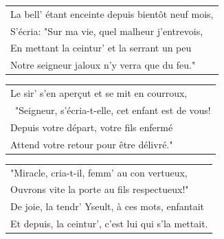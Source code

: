 \documentclass[a4paper, 14pt]{extarticle}
\begin{document}
\begin{flushleft}
\begin{tabularx}{0.8\textwidth} {
    >{\raggedright\arraybackslash}X}
La bell’ étant enceinte depuis bientôt neuf mois,\\
S’écria: "Sur ma vie, quel malheur j’entrevois,\\
En mettant la ceintur’ et la serrant un peu\\
Notre seigneur jaloux n’y verra que du feu."\\
\end{tabularx}
\end{flushleft}
\begin{flushleft}
\begin{tabularx}{0.8\textwidth} {
    >{\raggedright\arraybackslash}X}
Le sir’ s’en aperçut et se mit en courroux,\\\
"Seigneur, s’écria-t-elle, cet enfant est de vous!\\
Depuis votre départ, votre fils enfermé\\
Attend votre retour pour être délivré."\\
\end{tabularx}
\end{flushleft}
\begin{flushleft}
\begin{tabularx}{0.8\textwidth} {
    >{\raggedright\arraybackslash}X}
"Miracle, cria-t-il, femm’ au con vertueux,\\
Ouvrons vite la porte au fils respectueux!"\\
De joie, la tendr’ Yseult, à ces mots, enfantait\\
Et depuis, la ceintur’, c’est lui qui s’la mettait.\\
\end{tabularx}
\end{flushleft}
\end{document}

